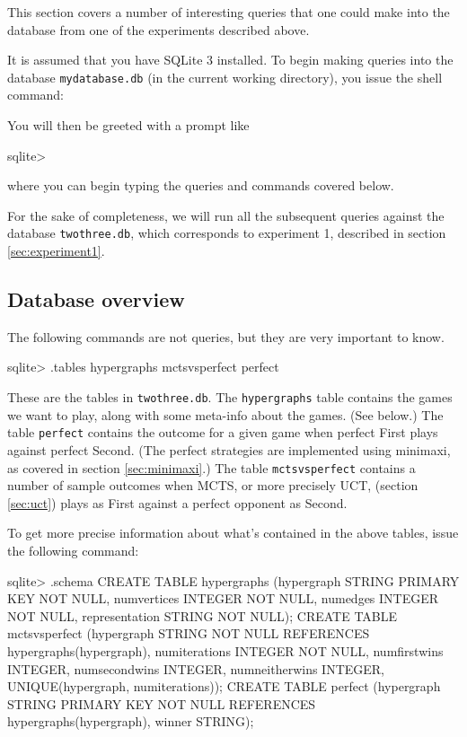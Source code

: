 This section covers a number of interesting queries that one could make into the database from one of the experiments described above.

It is assumed that you have SQLite 3 installed.
To begin making queries into the database \texttt{mydatabase.db} (in the current working directory), you issue the shell command:


You will then be greeted with a prompt like

\begin{code}
sqlite> 
\end{code}

where you can begin typing the queries and commands covered below.

For the sake of completeness, we will run all the subsequent queries against the database \texttt{twothree.db}, which corresponds to experiment 1, described in section \ref{sec:experiment1}.

\subsection{Database overview}

The following commands are not queries, but they are very important to know.

\begin{code}
sqlite> .tables
hypergraphs    mctsvsperfect  perfect 
\end{code}

These are the tables in \texttt{twothree.db}. The \texttt{hypergraphs} table contains the games we want to play, along with some meta-info about the games. (See below.)
The table \texttt{perfect} contains the outcome for a given game when perfect First plays against perfect Second. (The perfect strategies are implemented using minimaxi, as covered in section \ref{sec:minimaxi}.)
The table \texttt{mctsvsperfect} contains a number of sample outcomes when MCTS, or more precisely UCT, (section \ref{sec:uct}) plays as First against a perfect opponent as Second.

To get more precise information about what's contained in the above tables, issue the following command:

\begin{code}
sqlite> .schema
CREATE TABLE hypergraphs
(hypergraph STRING PRIMARY KEY NOT NULL,
 numvertices INTEGER NOT NULL,
 numedges INTEGER NOT NULL,
 representation STRING NOT NULL);
CREATE TABLE mctsvsperfect
(hypergraph STRING NOT NULL REFERENCES hypergraphs(hypergraph),
 numiterations INTEGER NOT NULL,
 numfirstwins INTEGER, numsecondwins INTEGER,
 numneitherwins INTEGER,
 UNIQUE(hypergraph, numiterations));
CREATE TABLE perfect
(hypergraph STRING PRIMARY KEY NOT NULL REFERENCES hypergraphs(hypergraph),
 winner STRING);
\end{code}

